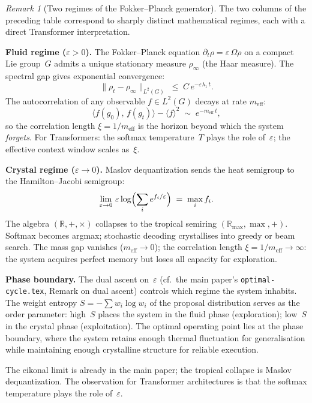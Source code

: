 \documentclass[11pt,a4paper]{article}
\theoremstyle{definition}
\theoremstyle{remark}
\newtheorem{remark}[theorem]{Remark}
\begin{document}
\begin{remark}[Two regimes of the Fokker--Planck generator]
\label{rmk:two-regimes}
The two columns of the preceding table correspond to sharply distinct
mathematical regimes, each with a direct Transformer interpretation.

\medskip\noindent\textbf{Fluid regime ($\varepsilon > 0$).}
The Fokker--Planck equation
$\partial_t\rho = \varepsilon\,\Omega\rho$
on a compact Lie group~$G$ admits a unique stationary measure
$\rho_\infty$ (the Haar measure).  The spectral gap gives exponential
convergence:
\[
  \|\rho_t - \rho_\infty\|_{L^2(G)}
  \;\leq\; C\,e^{-\varepsilon\lambda_1\, t}.
\]
The autocorrelation of any observable $f \in L^2(G)$ decays at rate
$m_{\mathrm{eff}}$:
\[
  \langle f(g_0),\, f(g_t)\rangle - \langle f\rangle^2
  \;\sim\; e^{-m_{\mathrm{eff}}\,t},
\]
so the correlation length $\xi = 1/m_{\mathrm{eff}}$ is the horizon
beyond which the system \emph{forgets}.
For Transformers: the softmax temperature~$T$ plays the role
of~$\varepsilon$; the effective context window scales as~$\xi$.

\medskip\noindent\textbf{Crystal regime ($\varepsilon \to 0$).}
Maslov dequantization sends the heat semigroup to the Hamilton--Jacobi
semigroup:
\[
  \lim_{\varepsilon\to 0}\,\varepsilon\log
  \Bigl(\sum_i e^{f_i/\varepsilon}\Bigr)
  \;=\; \max_i f_i.
\]
The algebra $(\mathbb{R},+,\times)$ collapses to the tropical semiring
$(\mathbb{R}_{\max},\max,+)$.  Softmax becomes argmax; stochastic
decoding crystallises into greedy or beam search.
The mass gap vanishes ($m_{\mathrm{eff}} \to 0$); the correlation
length $\xi = 1/m_{\mathrm{eff}} \to \infty$: the system acquires
perfect memory but loses all capacity for exploration.

\medskip\noindent\textbf{Phase boundary.}
The dual ascent on~$\varepsilon$ (cf.\ the main paper's
\texttt{optimal-cycle.tex}, Remark on dual ascent) controls which
regime the system inhabits.
The weight entropy $S = -\sum w_i\log w_i$ of the proposal distribution
serves as the order parameter:
high~$S$ places the system in the fluid phase (exploration);
low~$S$ in the crystal phase (exploitation).
The optimal operating point lies at the phase boundary, where the
system retains enough thermal fluctuation for generalisation while
maintaining enough crystalline structure for reliable execution.
\end{remark}

\noindent
The eikonal limit is already in the main paper; the tropical collapse is
Maslov dequantization. The observation for Transformer architectures is
that the softmax temperature plays the role of~$\varepsilon$.
\end{document}
